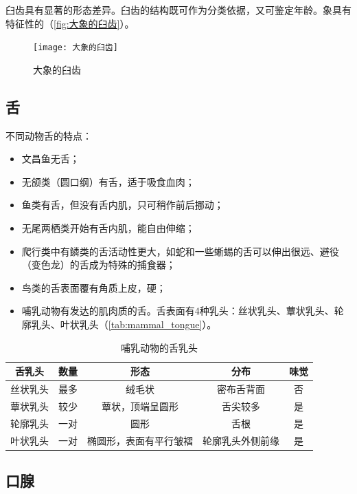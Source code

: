 臼齿具有显著的形态差异。臼齿的结构既可作为分类依据，又可鉴定年龄。象具有特征性的（\autoref{fig:大象的臼齿}）。

\begin{figure}[htbp]
	\centering
	\texttt{[image: 大象的臼齿]}
	\caption{大象的臼齿}
	\label{fig:大象的臼齿}
\end{figure}


\subsection{舌}

不同动物舌的特点：

\begin{itemize}
	\item 文昌鱼无舌；
	\item 无颌类（圆口纲）有舌，适于吸食血肉；
	\item 鱼类有舌，但没有舌内肌，只可稍作前后挪动；
	\item 无尾两栖类开始有舌内肌，能自由伸缩；
	\item 爬行类中有鳞类的舌活动性更大，如蛇和一些蜥蜴的舌可以伸出很远、避役（变色龙）的舌成为特殊的捕食器；
	\item 鸟类的舌表面覆有角质上皮，硬；
	\item 哺乳动物有发达的肌肉质的舌。舌表面有4种乳头：丝状乳头、蕈状乳头、轮廓乳头、叶状乳头（\autoref{tab:mammal_tongue}）。
\end{itemize}



\begin{table}[htbp]
	\centering
	\begin{tabularx}{\textwidth}{|c|c|C|C|c|}
		\hline
		\textbf{舌乳头} & \textbf{数量} & \textbf{形态} & \textbf{分布} & \textbf{味觉} \\ \hline
		丝状乳头 & 最多 & 绒毛状 & 密布舌背面 & 否 \\ \hline
		蕈状乳头 & 较少 & 蕈状，顶端呈圆形 & 舌尖较多 & 是 \\ \hline
		轮廓乳头 & 一对 & 圆形 & 舌根 & 是 \\ \hline
		叶状乳头 & 一对 & 椭圆形，表面有平行皱褶 & 轮廓乳头外侧前缘 & 是 \\ \hline
	\end{tabularx}
	\caption{哺乳动物的舌乳头}
	\label{tab:mammal_tongue}
\end{table}

\subsection{口腺}

